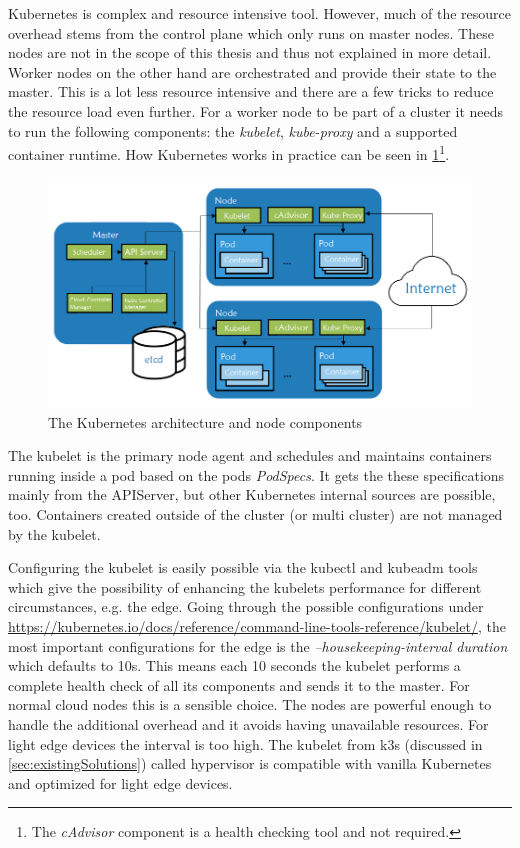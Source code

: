 Kubernetes is complex and resource intensive tool. However, much of the resource overhead stems from the control plane which only runs on master nodes. These nodes are not in the scope of this thesis and thus not explained in more detail. Worker nodes on the other hand are orchestrated and provide their state to the master. This is a lot less resource intensive and there are a few tricks to reduce the resource load even further. For a worker node to be part of a cluster it needs to run the following components: the \textit{kubelet}, \textit{kube-proxy} and a supported container runtime. How Kubernetes works in practice can be seen in \cref{fig:nodeComponents}\footnote{The \textit{cAdvisor} component is a health checking tool and not required.}.
\begin{figure}[h!]
    \centering
    \includegraphics[scale=0.6]{figures/rancherK8sComponents.png}
    \caption{The Kubernetes architecture and node components\cite{nodeSetupKubernetes:online}}
    \label{fig:nodeComponents}
\end{figure}
The kubelet is the primary node agent and schedules and maintains containers running inside a pod based on the pods \textit{PodSpecs}. It gets the these specifications mainly from the APIServer, but other Kubernetes internal sources are possible, too. Containers created outside of the cluster (or multi cluster) are not managed by the kubelet. 

Configuring the kubelet is easily possible via the kubectl and kubeadm tools which give the possibility of enhancing the kubelets performance for different circumstances, e.g. the edge. Going through the possible configurations under \url{https://kubernetes.io/docs/reference/command-line-tools-reference/kubelet/}, the most important configurations for the edge is the \textit{--housekeeping-interval duration} which defaults to 10s\cite{rancherKubernetesComponents:online}. This means each 10 seconds the kubelet performs a complete health check of all its components and sends it to the master. For normal cloud nodes this is a sensible choice. The nodes are powerful enough to handle the additional overhead and it avoids having unavailable resources. For light edge devices the interval is too high. The kubelet from k3s (discussed in \cref{sec:existingSolutions}) called hypervisor is compatible with vanilla Kubernetes and optimized for light edge devices.

